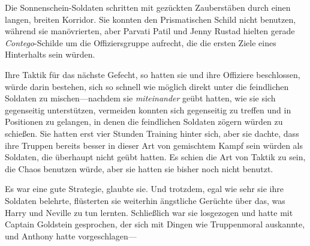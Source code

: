 \later

Die Sonnenschein-Soldaten schritten mit gezückten Zauberstäben durch einen langen, breiten Korridor. Sie konnten den Prismatischen Schild nicht benutzen, während sie manövrierten, aber Parvati Patil und Jenny Rustad hielten gerade \emph{Contego}-Schilde um die Offiziersgruppe aufrecht, die die ersten Ziele eines Hinterhalts sein würden.

Ihre Taktik für das nächste Gefecht, so hatten sie und ihre Offiziere beschlossen, würde darin bestehen, sich so schnell wie möglich direkt unter die feindlichen Soldaten zu mischen—nachdem sie \emph{miteinander} geübt hatten, wie sie sich gegenseitig unterstützen, vermeiden konnten sich gegenseitig zu treffen und in Positionen zu gelangen, in denen die feindlichen Soldaten zögern würden zu schießen. Sie hatten erst vier Stunden Training hinter sich, aber sie dachte, dass ihre Truppen bereits besser in dieser Art von gemischtem Kampf sein würden als Soldaten, die überhaupt nicht geübt hatten. Es schien die Art von Taktik zu sein, die Chaos benutzen würde, aber sie hatten sie bisher noch nicht benutzt.

Es war eine gute Strategie, glaubte sie. Und trotzdem, egal wie sehr sie ihre Soldaten belehrte, flüsterten sie weiterhin ängstliche Gerüchte über das, was Harry und Neville zu tun lernten. Schließlich war sie losgezogen und hatte mit Captain Goldstein gesprochen, der sich mit Dingen wie Truppenmoral auskannte, und Anthony hatte vorgeschlagen—

